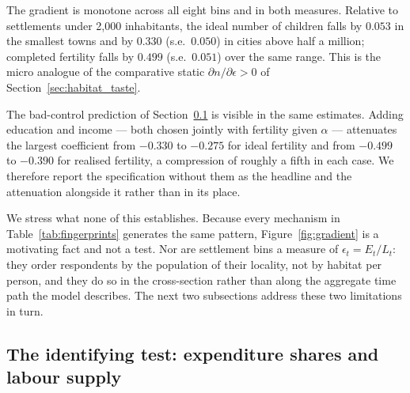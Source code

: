 \documentclass[11pt]{article}
\begin{document}
The gradient is monotone across all eight bins and in both measures. Relative to settlements under
2{,}000 inhabitants, the ideal number of children falls by $0.053$ in the smallest towns and by
$0.330$ (s.e.\ $0.050$) in cities above half a million; completed fertility falls by $0.499$
(s.e.\ $0.051$) over the same range. This is the micro analogue of the comparative static
$\partial n/\partial \epsilon>0$ of Section~\ref{sec:habitat_taste}.

The bad-control prediction of Section~\ref{sub:ltest} is visible in the same estimates. Adding
education and income --- both chosen jointly with fertility given $\alpha$ --- attenuates the
largest coefficient from $-0.330$ to $-0.275$ for ideal fertility and from $-0.499$ to $-0.390$ for
realised fertility, a compression of roughly a fifth in each case. We therefore report the
specification without them as the headline and the attenuation alongside it rather than in its
place.

We stress what none of this establishes. Because every mechanism in Table~\ref{tab:fingerprints} generates the same pattern,
Figure~\ref{fig:gradient} is a motivating fact and not a test. Nor are settlement bins a measure of
$\epsilon_t=E_t/L_t$: they order respondents by the population of their locality, not by habitat per
person, and they do so in the cross-section rather than along the aggregate time path the model
describes. The next two subsections address these two limitations in turn.

\subsection{The identifying test: expenditure shares and labour supply}
\label{sub:ltest}
\end{document}
